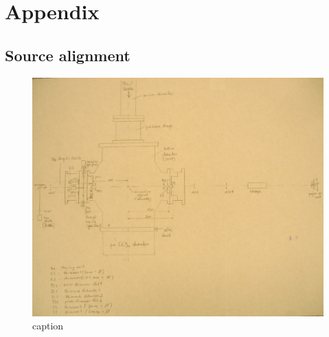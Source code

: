 \chapter{Appendix}
\section{Source alignment}\label{sec:source-alignment}
\begin{figure}
	\centering
		\includegraphics[width=1.00\textwidth]{images/Overview_Setup_Jetalignment.jpg}
	\caption{caption}
	\label{fig:Overview_Setup_Jetalignment}
\end{figure}
%
%
%
